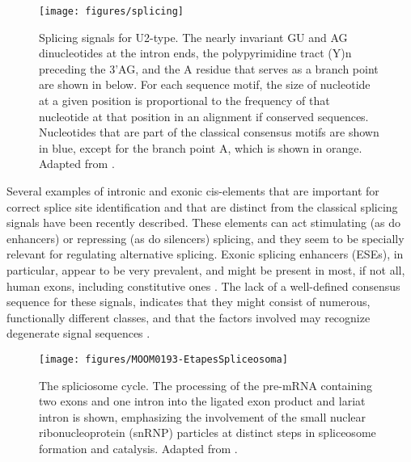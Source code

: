 \begin{figure}
\begin{center}
\texttt{[image: figures/splicing]}
\caption[Classical splicing signals]{Splicing signals for U2-type. The
nearly invariant GU and AG dinucleotides at the intron ends, the
polypyrimidine tract (Y)n preceding the 3'AG, and the A residue that
serves as a branch point are shown in below. For each sequence motif,
the size of nucleotide at a given position is proportional to the
frequency of that nucleotide at that position in an alignment if
conserved sequences. Nucleotides that are part of the classical
consensus motifs are shown in blue, except for the branch point A,
which is shown in orange. Adapted from \cite{cartegni:2002}.} 
\label{splice signals}
\end{center}
\end{figure}

Several examples of intronic and exonic cis-elements that are
important for correct splice site identification and that are distinct
from the classical splicing signals have been recently described.
These elements can act stimulating (as do enhancers) or repressing (as
do silencers) splicing, and they seem to be specially relevant for
regulating alternative splicing. Exonic splicing enhancers (ESEs), in
particular, appear to be very prevalent, and might be present in most,
if not all, human exons, including constitutive ones
\citep{cartegni:2002}.  The lack of a well-defined consensus sequence
for these signals, indicates that they might consist of numerous,
functionally different classes, and that the factors involved
may recognize degenerate signal sequences \citep{cartegni:2002}.

\begin{figure}
\begin{center}
\texttt{[image: figures/MOOM0193-EtapesSpliceosoma]}
\caption[The spliciosome cycle]{The spliciosome cycle. The processing
of the pre-mRNA containing two exons and one intron into the ligated
exon product and lariat intron is shown, emphasizing the involvement
of the small nuclear ribonucleoprotein (snRNP) particles at distinct
steps in spliceosome formation and catalysis. Adapted from
\cite{burge:1999a}.} \label{splicing process}
\end{center}
\end{figure}


